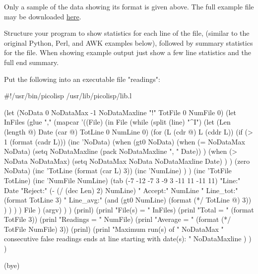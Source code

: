 Only a sample of the data showing its format is given above. The full
example file may be downloaded
\href{http://rosettacode.org/resources/readings.zip}{here}.

Structure your program to show statistics for each line of the file,
(similar to the original Python, Perl, and AWK examples below), followed
by summary statistics for the file. When showing example output just
show a few line statistics and the full end summary.



\begin{wideverbatim}



Put the following into an executable file "readings":

#!/usr/bin/picolisp /usr/lib/picolisp/lib.l

(let (NoData 0  NoDataMax -1  NoDataMaxline "!"  TotFile 0  NumFile 0)
   (let InFiles
      (glue ","
         (mapcar
            '((File)
               (in File
                  (while (split (line) "^I")
                     (let (Len (length @)  Date (car @)  TotLine 0  NumLine 0)
                        (for (L (cdr @)  L  (cddr L))
                           (if (> 1 (format (cadr L)))
                              (inc 'NoData)
                              (when (gt0 NoData)
                                 (when (= NoDataMax NoData)
                                    (setq NoDataMaxline (pack NoDataMaxline ", " Date)) )
                                 (when (> NoData NoDataMax)
                                    (setq NoDataMax NoData  NoDataMaxline Date) ) )
                              (zero NoData)
                              (inc 'TotLine (format (car L) 3))
                              (inc 'NumLine) ) )
                        (inc 'TotFile TotLine)
                        (inc 'NumFile NumLine)
                        (tab (-7 -12 -7 3 -9 3 -11 11 -11 11)
                           "Line:" Date
                           "Reject:" (- (/ (dec Len) 2) NumLine)
                           "  Accept:" NumLine
                           "  Line_tot:" (format TotLine 3)
                           "  Line_avg:"
                           (and (gt0 NumLine) (format (*/ TotLine @) 3)) ) ) ) )
               File )
            (argv) ) )
      (prinl)
      (prinl "File(s)  = " InFiles)
      (prinl "Total    = " (format TotFile 3))
      (prinl "Readings = " NumFile)
      (prinl "Average  = " (format (*/ TotFile NumFile) 3))
      (prinl)
      (prinl
         "Maximum run(s) of " NoDataMax
         " consecutive false readings ends at line starting with
         date(s): " NoDataMaxline ) ) )

(bye)

\end{wideverbatim}

